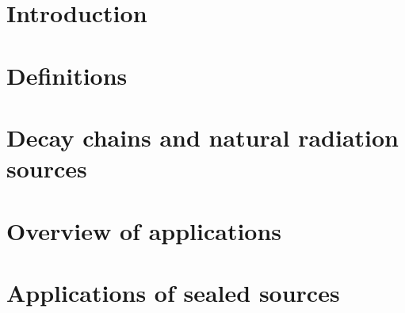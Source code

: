 \section{Introduction}
\section{Definitions}
\section{Decay chains and natural radiation sources}
\section{Overview of applications}
\section{Applications of sealed sources}%
